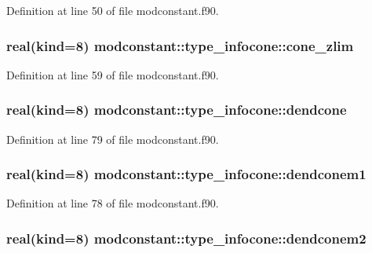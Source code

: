 Definition at line 50 of file modconstant.\-f90.

\hypertarget{structmodconstant_1_1type__infocone_ae9da46dfd6bb0ce1670e30f549e35b96}{
\subsubsection[{cone\-\_\-zlim}]{\setlength{\rightskip}{0pt plus 5cm}real(kind=8) modconstant\-::type\-\_\-infocone\-::cone\-\_\-zlim}}\label{structmodconstant_1_1type__infocone_ae9da46dfd6bb0ce1670e30f549e35b96}


Definition at line 59 of file modconstant.\-f90.

\hypertarget{structmodconstant_1_1type__infocone_a5195c1481dcc3aa8a78e0ea6f7cc8b73}{
\subsubsection[{dendcone}]{\setlength{\rightskip}{0pt plus 5cm}real(kind=8) modconstant\-::type\-\_\-infocone\-::dendcone}}\label{structmodconstant_1_1type__infocone_a5195c1481dcc3aa8a78e0ea6f7cc8b73}


Definition at line 79 of file modconstant.\-f90.

\hypertarget{structmodconstant_1_1type__infocone_a5cb1605382b9614c89f416b0e3ed3b7b}{
\subsubsection[{dendconem1}]{\setlength{\rightskip}{0pt plus 5cm}real(kind=8) modconstant\-::type\-\_\-infocone\-::dendconem1}}\label{structmodconstant_1_1type__infocone_a5cb1605382b9614c89f416b0e3ed3b7b}


Definition at line 78 of file modconstant.\-f90.

\hypertarget{structmodconstant_1_1type__infocone_a106c87e477c927a94a7569eebf80c7b8}{
\subsubsection[{dendconem2}]{\setlength{\rightskip}{0pt plus 5cm}real(kind=8) modconstant\-::type\-\_\-infocone\-::dendconem2}}\label{structmodconstant_1_1type__infocone_a106c87e477c927a94a7569eebf80c7b8}


